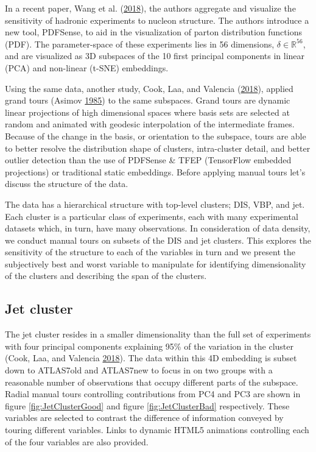 In a recent paper, Wang et al.
(\protect\hyperlink{ref-wang_mapping_2018}{2018}), the authors aggregate
and visualize the sensitivity of hadronic experiments to nucleon
structure. The authors introduce a new tool, PDFSense, to aid in the
visualization of parton distribution functions (PDF). The
parameter-space of these experiments lies in 56 dimensions,
\(\delta \in \mathbb{R}^{56}\), and are visualized as 3D subspaces of
the 10 first principal components in linear (PCA) and non-linear (t-SNE)
embeddings.

Using the same data, another study, Cook, Laa, and Valencia
(\protect\hyperlink{ref-cook_dynamical_2018}{2018}), applied grand tours
(Asimov \protect\hyperlink{ref-asimov_grand_1985}{1985}) to the same
subspaces. Grand tours are dynamic linear projections of high
dimensional spaces where basis sets are selected at random and animated
with geodesic interpolation of the intermediate frames. Because of the
change in the basis, or orientation to the subspace, tours are able to
better resolve the distribution shape of clusters, intra-cluster detail,
and better outlier detection than the use of PDFSense \& TFEP
(TensorFlow embedded projections) or traditional static embeddings.
Before applying manual tours let's discuss the structure of the data.

The data has a hierarchical structure with top-level clusters; DIS, VBP,
and jet. Each cluster is a particular class of experiments, each with
many experimental datasets which, in turn, have many observations. In
consideration of data density, we conduct manual tours on subsets of the
DIS and jet clusters. This explores the sensitivity of the structure to
each of the variables in turn and we present the subjectively best and
worst variable to manipulate for identifying dimensionality of the
clusters and describing the span of the clusters.

\hypertarget{jet-cluster}{%
\subsection{Jet cluster}\label{jet-cluster}}

The jet cluster resides in a smaller dimensionality than the full set of
experiments with four principal components explaining 95\% of the
variation in the cluster (Cook, Laa, and Valencia
\protect\hyperlink{ref-cook_dynamical_2018}{2018}). The data within this
4D embedding is subset down to ATLAS7old and ATLAS7new to focus in on
two groups with a reasonable number of observations that occupy
different parts of the subspace. Radial manual tours controlling
contributions from PC4 and PC3 are shown in figure
\ref{fig:JetClusterGood} and figure \ref{fig:JetClusterBad}
respectively. These variables are selected to contrast the difference of
information conveyed by touring different variables. Links to dynamic
HTML5 animations controlling each of the four variables are also
provided.

